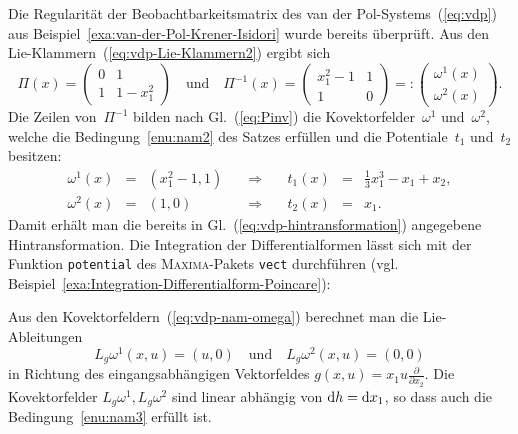 \begin{example}
\label{exa:van-der-pol-nam}Die Regularität der Beobachtbarkeitsmatrix
des van der Pol-Systems~(\ref{eq:vdp}) aus Beispiel~\ref{exa:van-der-Pol-Krener-Isidori}
wurde bereits überprüft. Aus den Lie-Klammern~(\ref{eq:vdp-Lie-Klammern2})
ergibt sich
\begin{equation}
\Pi(x)=\left(\begin{array}{cc}
0 & 1\\
1 & 1-x_{1}^{2}
\end{array}\right)\quad\text{und}\quad\Pi^{-1}(x)=\left(\begin{array}{cc}
x_{1}^{2}-1 & 1\\
1 & 0
\end{array}\right)=:\left(\begin{array}{c}
\omega^{1}(x)\\
\omega^{2}(x)
\end{array}\right).\label{eq:vdp-nam-omega}
\end{equation}
Die Zeilen von~$\Pi^{-1}$ bilden nach Gl.~(\ref{eq:Pinv}) die
Kovektorfelder~$\omega^{1}$ und~$\omega^{2}$, welche die Bedingung~\ref{enu:nam2}
des Satzes erfüllen und die Potentiale~$t_{1}$ und~$t_{2}$ besitzen:
\[
\begin{array}{lclclcl}
\omega^{1}(x) & = & (x_{1}^{2}-1,1) & \quad\Rightarrow\quad & t_{1}(x) & = & \frac{1}{3}x_{1}^{3}-x_{1}+x_{2},\\
\omega^{2}(x) & = & (1,0) & \quad\Rightarrow\quad & t_{2}(x) & = & x_{1}.
\end{array}
\]
Damit erhält man die bereits in Gl.~(\ref{eq:vdp-hintransformation})
angegebene Hintransformation. Die Integration der Differentialformen
lässt sich mit der Funktion \texttt{potential} des \textsc{Maxima}-Pakets
\texttt{vect} durchführen (vgl. Beispiel~\ref{exa:Integration-Differentialform-Poincare}):

\begin{maxima}\end{maxima}

Aus den Kovektorfeldern~(\ref{eq:vdp-nam-omega}) berechnet man die
Lie-Ableitungen 
\[
L_{g}\omega^{1}(x,u)=(u,0)\quad\text{und}\quad L_{g}\omega^{2}(x,u)=(0,0)
\]
in Richtung des eingangsabhängigen Vektorfeldes $g(x,u)=x_{1}u\tfrac{\partial}{\partial x_{2}}$.
Die Kovektorfelder $L_{g}\omega^{1},L_{g}\omega^{2}$ sind linear
abhängig von ${\mathrm{d}} h={\mathrm{d}} x_{1}$, so dass auch die Bedingung~\ref{enu:nam3}
erfüllt ist.
\end{example}


